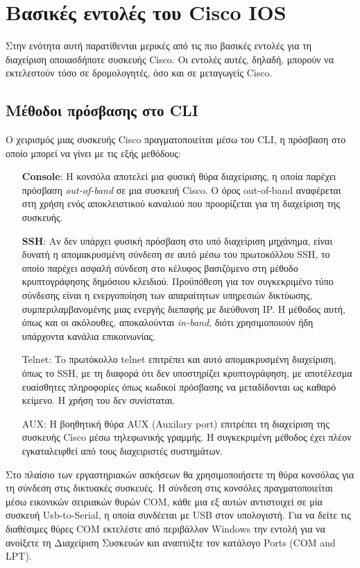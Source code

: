 \documentclass{EdipyLabs} %
\begin{document}
\section{Βασικές εντολές του Cisco IOS}
Στην ενότητα αυτή παρατίθενται μερικές από τις πιο βασικές εντολές για τη διαχείριση οποιασδήποτε συσκευής Cisco. Οι εντολές αυτές, δηλαδή, μπορούν να εκτελεστούν τόσο σε δρομολογητές, όσο και σε μεταγωγείς Cisco.

\subsection{Μέθοδοι πρόσβασης στο CLI}
Ο χειρισμός μιας συσκευής Cisco πραγματοποιείται μέσω του CLI, η πρόσβαση στο οποίο μπορεί να γίνει με τις εξής μεθόδους:
\begin{itemize}
	\item [\textbf{Console}:] Η κονσόλα αποτελεί μια φυσική θύρα διαχείρισης, η οποία παρέχει πρόσβαση \textit{out-of-band} σε μια συσκευή Cisco. Ο όρος out-of-band αναφέρεται στη χρήση ενός αποκλειστικού καναλιού που προορίζεται για τη διαχείριση της συσκευής.
	\item [\textbf{SSH}:] Αν δεν υπάρχει φυσική πρόσβαση στο υπό διαχείριση μηχάνημα, είναι δυνατή η απομακρυσμένη σύνδεση σε αυτό μέσω του πρωτοκόλλου SSH, το οποίο παρέχει ασφαλή σύνδεση στο κέλυφος βασιζόμενο στη μέθοδο κρυπτογράφησης δημόσιου κλειδιού. Προϋπόθεση για τον συγκεκριμένο τύπο σύνδεσης είναι η ενεργοποίηση των απαραίτητων υπηρεσιών δικτύωσης, συμπεριλαμβανομένης μιας ενεργής διεπαφής με διεύθυνση IP. Η μέθοδος αυτή, όπως και οι ακόλουθες, αποκαλούνται \textit{in-band}, διότι χρησιμοποιούν ήδη υπάρχοντα κανάλια επικοινωνίας.
	\item [Telnet:] To πρωτόκολλο telnet επιτρέπει και αυτό απομακρυσμένη διαχείριση, όπως το SSH, με τη διαφορά ότι δεν υποστηρίζει κρυπτογράφηση, με αποτέλεσμα ευαίσθητες πληροφορίες όπως κωδικοί πρόσβασης να μεταδίδονται ως καθαρό κείμενο. Η χρήση του δεν συνίσταται.
	\item [AUX:] Η βοηθητική θύρα AUX (Auxilary port) επιτρέπει τη διαχείριση της συσκευής Cisco μέσω τηλεφωνικής γραμμής. Η συγκεκριμένη μέθοδος έχει πλέον εγκαταλειφθεί από τους διαχειριστές συστημάτων.
\end{itemize}

Στο πλαίσιο των εργαστηριακών ασκήσεων θα χρησιμοποιήσετε τη θύρα κονσόλας για τη σύνδεση στις δικτυακές συσκευές. Η σύνδεση στις κονσόλες πραγματοποιείται μέσω εικονικών σειριακών θυρών COM, κάθε μια εξ αυτών αντιστοιχεί σε μία συσκευή Usb-to-Serial, η οποία συνδέεται με USB στον υπολογιστή. Για να δείτε τις διαθέσιμες θύρες COM εκτελέστε από περιβάλλον Windows την εντολή  για να ανοίξετε τη Διαχείριση Συσκευών και αναπτύξτε τον κατάλογο Ports (COM and LPT).
\end{document}
